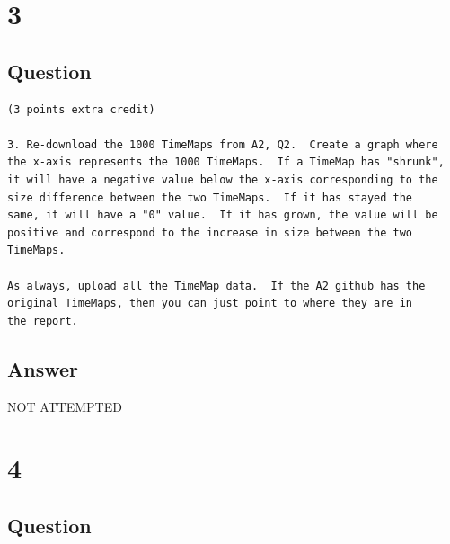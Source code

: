 \documentclass[letterpaper,11pt]{article}
\begin{document}
\clearpage


\section*{3}

\subsection*{Question}

\begin{verbatim}
(3 points extra credit)

3. Re-download the 1000 TimeMaps from A2, Q2.  Create a graph where
the x-axis represents the 1000 TimeMaps.  If a TimeMap has "shrunk",
it will have a negative value below the x-axis corresponding to the
size difference between the two TimeMaps.  If it has stayed the
same, it will have a "0" value.  If it has grown, the value will be 
positive and correspond to the increase in size between the two
TimeMaps.

As always, upload all the TimeMap data.  If the A2 github has the 
original TimeMaps, then you can just point to where they are in 
the report.
\end{verbatim}

\subsection*{Answer}

\begin{center}
\Huge{NOT ATTEMPTED}
\end{center}


\clearpage


\section*{4}

\subsection*{Question}
\end{document}
